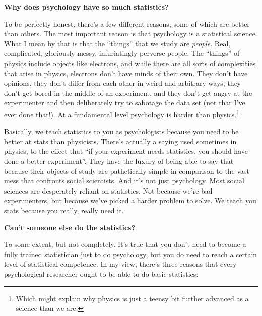 \documentclass[
]{book}
\begin{document}
\textbf{Why does psychology have so much statistics?}

To be perfectly honest, there's a few different reasons, some of which are better than others. The most important reason is that psychology is a statistical science. What I mean by that is that the ``things'' that we study are \emph{people}. Real, complicated, gloriously messy, infuriatingly perverse people. The ``things'' of physics include objects like electrons, and while there are all sorts of complexities that arise in physics, electrons don't have minds of their own. They don't have opinions, they don't differ from each other in weird and arbitrary ways, they don't get bored in the middle of an experiment, and they don't get angry at the experimenter and then deliberately try to sabotage the data set (not that I've ever done that!). At a fundamental level psychology is harder than physics.\footnote{Which might explain why physics is just a teensy bit further advanced as a science than we are.}

Basically, we teach statistics to you as psychologists because you need to be better at stats than physicists. There's actually a saying used sometimes in physics, to the effect that ``if your experiment needs statistics, you should have done a better experiment''. They have the luxury of being able to say that because their objects of study are pathetically simple in comparison to the vast mess that confronts social scientists. And it's not just psychology. Most social sciences are desperately reliant on statistics. Not because we're bad experimenters, but because we've picked a harder problem to solve. We teach you stats because you really, really need it.

\textbf{Can't someone else do the statistics?}

To some extent, but not completely. It's true that you don't need to become a fully trained statistician just to do psychology, but you do need to reach a certain level of statistical competence. In my view, there's three reasons that every psychological researcher ought to be able to do basic statistics:
\end{document}
